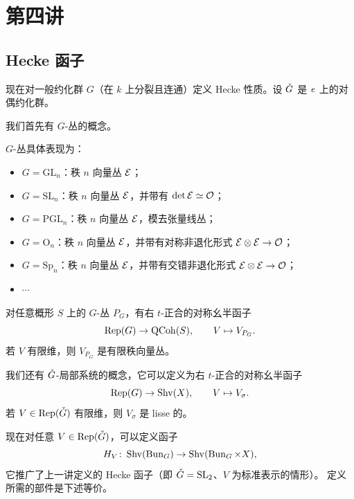 \section{第四讲}

\subsection{Hecke 函子}

现在对一般约化群 \(G\)（在 \(k\) 上分裂且连通）定义 Hecke 性质。设 \(\check{G}\) 是 \(\mathit{e}\) 上的对偶约化群。

我们首先有 \(G\)-丛的概念。

\begin{example}\label{ex:g-bundles}
\(G\)-丛具体表现为：

\begin{itemize}
\item \(G=\mathrm{GL}_n\)：秩 \(n\) 向量丛 \(\mathcal{E}\)；
\item \(G=\mathrm{SL}_n\)：秩 \(n\) 向量丛 \(\mathcal{E}\)，并带有 \(\det\mathcal{E}\simeq\mathcal{O}\)；
\item \(G=\mathrm{PGL}_n\)：秩 \(n\) 向量丛 \(\mathcal{E}\)，模去张量线丛；
\item \(G=\mathrm{O}_n\)：秩 \(n\) 向量丛 \(\mathcal{E}\)，并带有对称非退化形式 \(\mathcal{E}\otimes\mathcal{E}\to\mathcal{O}\)；
\item \(G=\mathrm{Sp}_n\)：秩 \(n\) 向量丛 \(\mathcal{E}\)，并带有交错非退化形式 \(\mathcal{E}\otimes\mathcal{E}\to\mathcal{O}\)；
\item \(\cdots\)
\end{itemize}
\end{example}

对任意概形 \(S\) 上的 \(G\)-丛 \(P_G\)，有右 \(t\)-正合的对称幺半函子
\[
\operatorname{Rep}(G)\to\operatorname{QCoh}(S),\qquad V\mapsto V_{P_G}.
\]
若 \(V\) 有限维，则 \(V_{P_G}\) 是有限秩向量丛。

我们还有 \(\check{G}\)-局部系统的概念，它可以定义为右 \(t\)-正合的对称幺半函子
\[
\operatorname{Rep}(G)\to\operatorname{Shv}(X),\qquad V\mapsto V_\sigma.
\]
若 \(V\in\operatorname{Rep}(\check{G})\) 有限维，则 \(V_\sigma\) 是 lisse 的。

现在对任意 \(V\in\operatorname{Rep}(\check{G})\)，可以定义函子
\[
H_V\colon\operatorname{Shv}(\operatorname{Bun}_G)\to\operatorname{Shv}(\operatorname{Bun}_G\times X),
\]
它推广了上一讲定义的 Hecke 函子（即 \(\check{G}=\mathrm{SL}_2\)、\(V\) 为标准表示的情形）。
定义所需的部件是下述等价。

